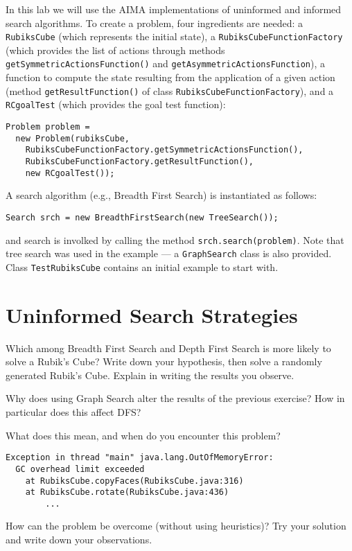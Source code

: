 \documentclass[a4paper]{article}
\begin{document}
In this lab we will use the AIMA implementations of uninformed and informed search algorithms.  To create a problem, four ingredients are needed: a {\tt RubiksCube} (which represents the initial state), a {\tt RubiksCubeFunctionFactory} (which provides the list of actions through methods {\tt getSymmetricActionsFunction()} and {\tt getAsymmetricActionsFunction}), a function to compute the state resulting from the application of a given action (method {\tt getResultFunction()} of class {\tt RubiksCubeFunctionFactory}), and a {\tt RCgoalTest} (which provides the goal test function):

\begin{verbatim}
Problem problem =
  new Problem(rubiksCube,
    RubiksCubeFunctionFactory.getSymmetricActionsFunction(),
    RubiksCubeFunctionFactory.getResultFunction(),
    new RCgoalTest());
\end{verbatim}

\noindent A search algorithm (e.g., Breadth First Search) is instantiated as follows:

\begin{verbatim}
Search srch = new BreadthFirstSearch(new TreeSearch());
\end{verbatim}

\noindent and search is involked by calling the method {\tt srch.search(problem)}.  Note that tree search was used in the example --- a {\tt GraphSearch} class is also provided.  Class {\tt TestRubiksCube} contains an initial example to start with.

\section{Uninformed Search Strategies}

{\ex{}\label{ex:ex1} Which among Breadth First Search and Depth First Search is more likely to solve a Rubik's Cube?  Write down your hypothesis, then solve a randomly generated Rubik's Cube.  Explain in writing the results you observe.\vspace{0.1cm}}

{\ex{}\label{ex:ex2} Why does using Graph Search alter the results of the previous exercise?  How in particular does this affect DFS?\vspace{0.1cm}}

{\ex{}\label{ex:ex3} What does this mean, and when do you encounter this problem?  
\begin{verbatim}
Exception in thread "main" java.lang.OutOfMemoryError:
  GC overhead limit exceeded
    at RubiksCube.copyFaces(RubiksCube.java:316)
    at RubiksCube.rotate(RubiksCube.java:436)
        ...
\end{verbatim}
How can the problem be overcome (without using heuristics)?  Try your solution and write down your observations.
\vspace{0.1cm}}
\end{document}
